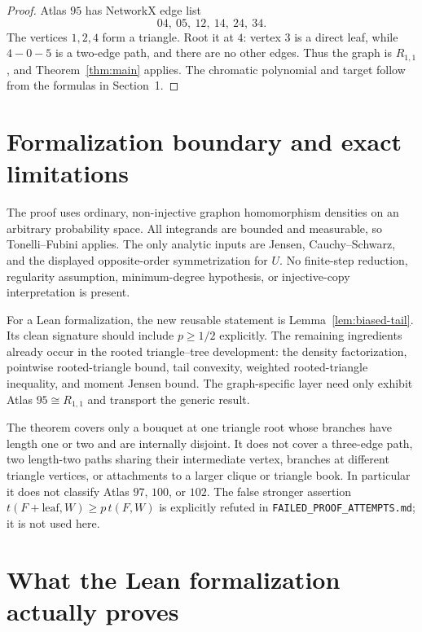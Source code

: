 \documentclass[11pt]{article}
\begin{document}
\begin{proof}
Atlas $95$ has NetworkX edge list
\[
 04,\ 05,\ 12,\ 14,\ 24,\ 34.
\]
The vertices $1,2,4$ form a triangle.  Root it at $4$: vertex $3$ is a
direct leaf, while $4-0-5$ is a two-edge path, and there are no other edges.
Thus the graph is $R_{1,1}$, and Theorem~\ref{thm:main} applies.  The
chromatic polynomial and target follow from the formulas in Section~1.
\end{proof}


\section{Formalization boundary and exact limitations}

The proof uses ordinary, non-injective graphon homomorphism densities on an
arbitrary probability space.  All integrands are bounded and measurable, so
Tonelli--Fubini applies.  The only analytic inputs are Jensen,
Cauchy--Schwarz, and the displayed opposite-order symmetrization for $U$.
No finite-step reduction, regularity assumption, minimum-degree hypothesis,
or injective-copy interpretation is present.

For a Lean formalization, the new reusable statement is
Lemma~\ref{lem:biased-tail}.  Its clean signature should include
$p\geq1/2$ explicitly.  The remaining ingredients already occur in the
rooted triangle--tree development: the density factorization, pointwise
rooted-triangle bound, tail convexity, weighted rooted-triangle inequality,
and moment Jensen bound.  The graph-specific layer need only exhibit Atlas
$95\cong R_{1,1}$ and transport the generic result.

The theorem covers only a bouquet at one triangle root whose branches have
length one or two and are internally disjoint.  It does not cover a
three-edge path, two length-two paths sharing their intermediate vertex,
branches at different triangle vertices, or attachments to a larger clique
or triangle book.  In particular it does not classify Atlas $97$, $100$, or
$102$.  The false stronger assertion
$t(F+\text{leaf},W)\geq p\,t(F,W)$ is explicitly refuted in
\texttt{FAILED\_PROOF\_ATTEMPTS.md}; it is not used here.


\section{What the Lean formalization actually proves}
\end{document}
